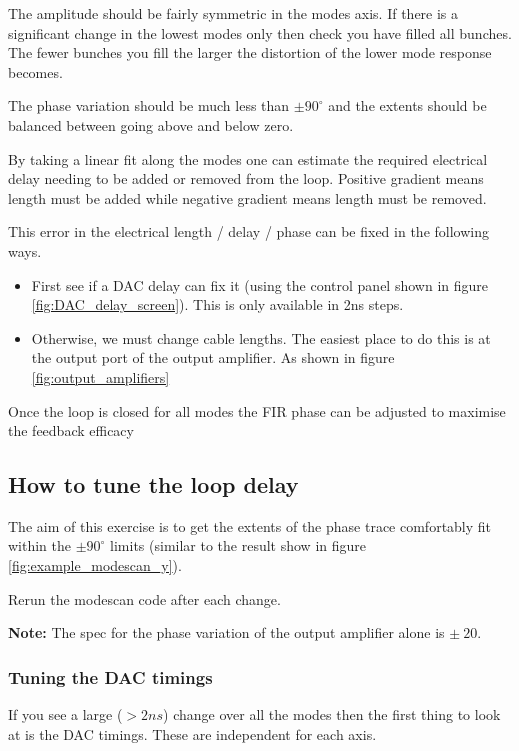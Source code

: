 \documentclass{report}
\begin{document}
The amplitude should be fairly symmetric in the modes axis. If there is a significant change in the lowest modes only then check you have filled all bunches. The fewer bunches you fill the larger the distortion of the lower mode response becomes. 

The phase variation should be much less than $\pm90^\circ$ and the extents should be balanced between going above and below zero.

By taking a linear fit along the modes one can estimate the required electrical delay needing to be added or removed from the loop. Positive gradient means length must be added while negative gradient means length must be removed.

This error in the electrical length / delay / phase can be fixed in the following ways. 
\begin{itemize}
    \item {First see if a DAC delay can fix it (using the control panel shown in figure \ref{fig:DAC_delay_screen}). This is only available in 2ns steps.}
    \item {Otherwise, we must change cable lengths. The easiest place to do this is at the output port of the output amplifier. As shown in figure \ref{fig:output_amplifiers}}
\end{itemize}
Once the loop is closed for all modes the FIR phase can be adjusted to maximise the feedback efficacy

\subsection{How to tune the loop delay} 

The aim of this exercise is to get the extents of the phase trace comfortably fit within the $\pm90^\circ$ limits (similar to the result show in figure \ref{fig:example_modescan_y}). 

Rerun the modescan code after each change.
\begin{tcolorbox}
\textbf{Note:} The spec for the phase variation of the output amplifier alone is $\pm~20$.
\end{tcolorbox}

\subsubsection{Tuning the DAC timings}
If you see a large ($>2ns$) change over all the modes then the first thing to look at is the DAC timings. These are independent for each axis.
\end{document}
